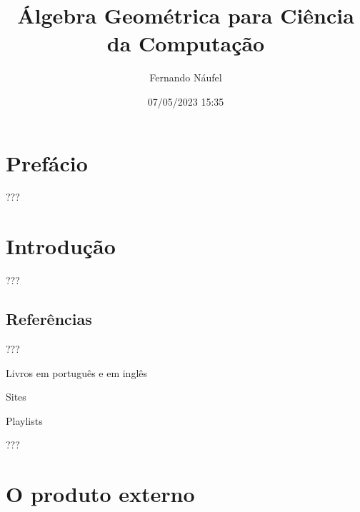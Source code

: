 \documentclass[
  letterpaper,
  DIV=11,
  numbers=noendperiod]{scrreprt}
\title{Álgebra Geométrica para Ciência da Computação}
\author{Fernando Náufel}
\date{07/05/2023 15:35}
\renewcommand*\contentsname{Índice}
\newcommand\contentsname{Índice}
\begin{document}
\maketitle


\ifdefined\Shaded\renewenvironment{Shaded}{\begin{tcolorbox}[frame hidden, borderline west={3pt}{0pt}{shadecolor}, breakable, boxrule=0pt, enhanced, interior hidden, sharp corners]}{\end{tcolorbox}}\fi

\renewcommand*\contentsname{Índice}
{
\hypersetup{linkcolor=}
\setcounter{tocdepth}{2}
\tableofcontents
}
\providecommand{\reais}{\mathbb{R}}
\providecommand{\sen}{\text{sen}\,}
\providecommand{\vet}[1]{\mathbf{#1}}
\providecommand{\ve}[1]{\vet{e}_{#1}}

\hypertarget{prefuxe1cio}{%
\chapter*{Prefácio}\label{prefuxe1cio}}

???

\hypertarget{sec-intro}{%
\chapter{Introdução}\label{sec-intro}}

???

\hypertarget{referuxeancias}{%
\section{Referências}\label{referuxeancias}}

???

Livros em português e em inglês

Sites

Playlists

???

\providecommand{\reais}{\mathbb{R}}
\providecommand{\sen}{\text{sen}\,}
\providecommand{\vet}[1]{\mathbf{#1}}
\providecommand{\ve}[1]{\vet{e}_{#1}}

\hypertarget{sec-prod-ext}{%
\chapter{O produto externo}\label{sec-prod-ext}}
\end{document}
